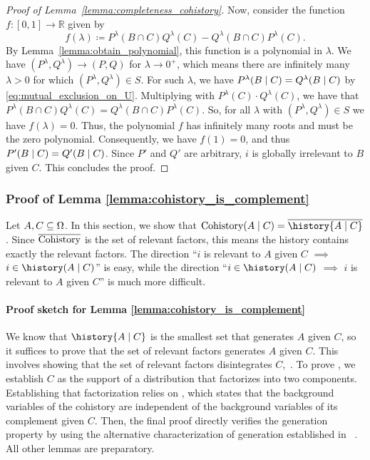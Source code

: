 \documentclass[USenglish,onecolumn]{article}
\begin{document}
\begin{proof}[Proof of Lemma~\ref{lemma:completeness_cohistory}]
  Now, consider the function $f: [0, 1] \to \mathbb{R}$ given by
  \begin{equation*}
    f(\lambda) \coloneqq P^{\lambda}(B \cap C) Q^{\lambda}(C) - Q^{\lambda}(B \cap C)P^{\lambda}(C).
  \end{equation*}
  By Lemma~\ref{lemma:obtain_polynomial}, this function is a polynomial in $\lambda$.
  We have $(P^{\lambda}, Q^{\lambda}) \to (P, Q)$ for $\lambda \to 0^{+}$, which means there are infinitely many $\lambda > 0$ for which $(P^{\lambda}, Q^{\lambda}) \in S$.
  For such $\lambda$, we have $P^{\lambda}(B \mid C) = Q^{\lambda}(B \mid C)$ by \eqref{eq:mutual_exclusion_on_U}. Multiplying with $P^{\lambda}(C) \cdot Q^{\lambda}(C)$, we have that $P^\lambda(B\cap C)Q^\lambda(C)=Q^{\lambda}(B \cap C)P^{\lambda}(C)$. So, for all $\lambda$ with $(P^{\lambda}, Q^{\lambda}) \in S$  we have $f(\lambda) = 0$.
  Thus, the polynomial $f$ has infinitely many roots and must be the zero polynomial.
  Consequently, we have $f(1) = 0$, and thus $P'(B \mid C) = Q'(B \mid C)$. Since $P'$ and $Q'$ are arbitrary, $i$ is globally irrelevant to $B$ given $C$. This concludes the proof.
\end{proof}


\subsubsection{Proof of Lemma \ref{lemma:cohistory_is_complement}}

Let $A, C \subseteq \Omega$.
In this section, we show that $\historyC(A \given C) = \comp{\history{A \given C}}$. Since ${\overline{\operatorname{Cohistory}}}$ is the set of  relevant factors, this means the history contains exactly the relevant factors.
The direction ``$i$ is relevant to $A$ given $C$ $\implies$ $i\in\history(A\given C)$'' is easy, while the direction ``$i\in\history(A\given C)$ $\implies$ $i$ is relevant to $A$ given $C$'' is much more difficult.

\paragraph{Proof sketch for Lemma \ref{lemma:cohistory_is_complement}}
We know that $\history{A \given C}$ is the smallest set that generates $A$ given $C$, so it suffices to prove that the set of relevant factors generates $A$ given $C$.
This involves showing that the set of relevant factors disintegrates $C$,~. 
To prove , we establish $C$ as the support of a distribution that factorizes into two components.
Establishing that factorization relies on , which states that the background variables of the cohistory are independent of the background variables of its complement given $C$. 
Then, the final proof directly verifies the generation property by using the alternative characterization of generation established in ~.
All other lemmas are preparatory.
\end{document}
